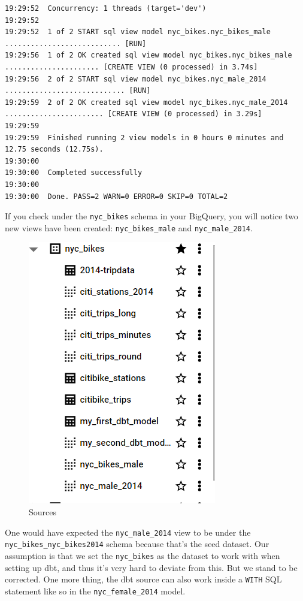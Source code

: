 \documentclass[
]{book}
\begin{document}
\begin{verbatim}
19:29:52  Concurrency: 1 threads (target='dev')
19:29:52  
19:29:52  1 of 2 START sql view model nyc_bikes.nyc_bikes_male ........................... [RUN]
19:29:56  1 of 2 OK created sql view model nyc_bikes.nyc_bikes_male ...................... [CREATE VIEW (0 processed) in 3.74s]
19:29:56  2 of 2 START sql view model nyc_bikes.nyc_male_2014 ............................ [RUN]
19:29:59  2 of 2 OK created sql view model nyc_bikes.nyc_male_2014 ....................... [CREATE VIEW (0 processed) in 3.29s]
19:29:59  
19:29:59  Finished running 2 view models in 0 hours 0 minutes and 12.75 seconds (12.75s).
19:30:00  
19:30:00  Completed successfully
19:30:00  
19:30:00  Done. PASS=2 WARN=0 ERROR=0 SKIP=0 TOTAL=2
\end{verbatim}

If you check under the \texttt{nyc\_bikes} schema in your BigQuery, you will notice two new views have been created: \texttt{nyc\_bikes\_male} and \texttt{nyc\_male\_2014}.

\begin{figure}
\centering
\includegraphics{./images/sources.png}
\caption{Sources}
\end{figure}

One would have expected the \texttt{nyc\_male\_2014} view to be under the \texttt{nyc\_bikes\_nyc\_bikes2014} schema because that's the seed dataset. Our assumption is that we set the \texttt{nyc\_bikes} as the dataset to work with when setting up dbt, and thus it's very hard to deviate from this. But we stand to be corrected. One more thing, the dbt source can also work inside a \texttt{WITH} SQL statement like so in the \texttt{nyc\_female\_2014} model.
\end{document}
